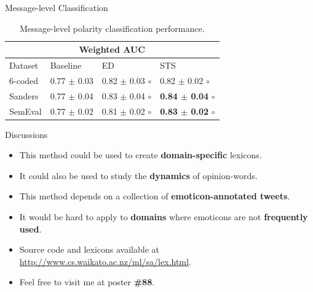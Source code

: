 \documentclass[handout]{beamer}
\begin{document}
\begin{frame}{Message-level Classification}
\footnotesize
\begin{table}[htbp]
\begin{center}
\begin{tabular}{l|l|l|l}
\hline \hline
\multicolumn{ 4}{c}{Weighted AUC } \\ \hline \hline
Dataset & Baseline & ED & STS  \\ \hline
6-coded & 0.77 $\pm$ 0.03 & 0.82 $\pm$ 0.03 $\circ$ & 0.82 $\pm$ 0.02 $\circ$  \\ 
Sanders & 0.77 $\pm$ 0.04 & 0.83 $\pm$ 0.04 $\circ$ & \textbf{0.84 $\pm$ 0.04} $\circ$  \\ 
SemEval & 0.77 $\pm$ 0.02 & 0.81 $\pm$ 0.02 $\circ$ & \textbf{0.83 $\pm$ 0.02} $\circ$ \\ \hline
\end{tabular}
\caption{Message-level polarity classification performance.}
\label{tab:messclass}
\end{center}
\end{table}
\end{frame}


\begin{frame}{Discussions}
\begin{scriptsize}
\begin{itemize}
\item This method could be used to create \textbf{domain-specific} lexicons.
\item It could also be used to study the \textbf{dynamics} of opinion-words.
\item This method depends on a collection of \textbf{emoticon-annotated tweets}.
\item It would be hard to apply to \textbf{domains} where emoticons are not \textbf{frequently used}.
\item Source code and lexicons available at \url{http://www.cs.waikato.ac.nz/ml/sa/lex.html}.
\item Feel free to visit me at poster \textbf{\#88}.

\end{itemize}
\end{scriptsize}

\end{frame}
\end{document}
